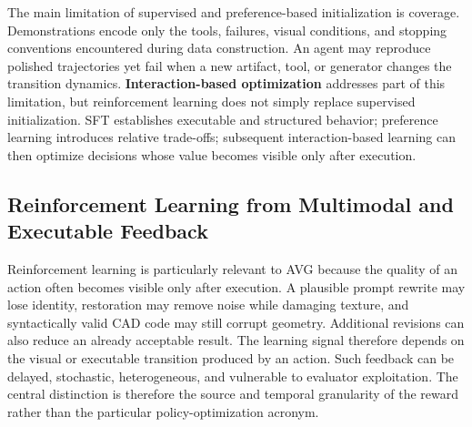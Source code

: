 The main limitation of supervised and preference-based initialization is coverage. Demonstrations encode only the tools, failures, visual conditions, and stopping conventions encountered during data construction. An agent may reproduce polished trajectories yet fail when a new artifact, tool, or generator changes the transition dynamics. \textbf{Interaction-based optimization} addresses part of this limitation, but reinforcement learning does not simply replace supervised initialization. SFT establishes executable and structured behavior; preference learning introduces relative trade-offs; subsequent interaction-based learning can then optimize decisions whose value becomes visible only after execution.

\subsection{Reinforcement Learning from Multimodal and Executable Feedback}
\label{subsec:multimodal-rl}

Reinforcement learning is particularly relevant to AVG because the quality of an action often becomes visible only after execution. A plausible prompt rewrite may lose identity, restoration may remove noise while damaging texture, and syntactically valid CAD code may still corrupt geometry. Additional revisions can also reduce an already acceptable result. The learning signal therefore depends on the visual or executable transition produced by an action. Such feedback can be delayed, stochastic, heterogeneous, and vulnerable to evaluator exploitation. The central distinction is therefore the source and temporal granularity of the reward rather than the particular policy-optimization acronym.

